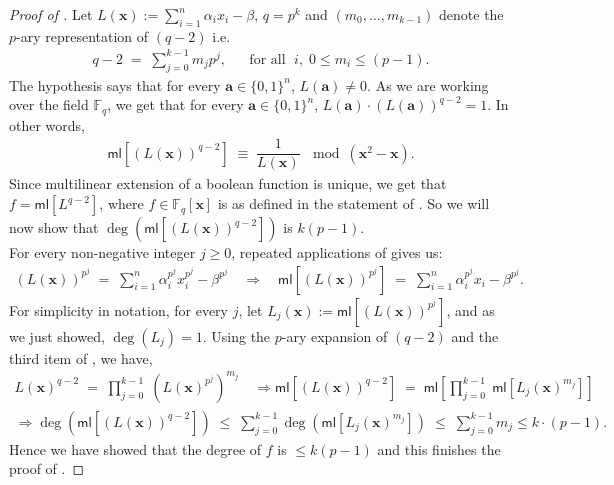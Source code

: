 \documentclass[11pt]{article}
\newcommand{\Boo}{\{0,1 \}}
\newcommand{\brac}[1]{\left[ #1 \right]}
\newcommand{\F}{\mathbb{F}}
\newcommand{\ml}{\mathsf{ml}}
\begin{document}
\begin{proof}[Proof of ]
Let $L(\mathbf{x}) := \sum_{i=1}^{n} \alpha_{i} x_{i} - \beta$, $q = p^{k}$ and $(m_{0},\ldots,m_{k-1})$ denote the $p$-ary representation of $(q-2)$ i.e.
\begin{align*}
    q-2 \; = \; \sum_{j=0}^{k-1} m_{j} p^{j}, && \text{for all } \; i, \; 0\leq m_{i} \leq (p-1).
\end{align*}
The hypothesis says that for every $\mathbf{a} \in \Boo^{n}$, $L(\mathbf{a}) \neq 0$. As we are working over the field $\F_{q}$, we get that for every $\mathbf{a} \in \Boo^{n}$, $L(\mathbf{a}) \cdot (L(\mathbf{a}))^{q-2} = 1$. In other words,
\begin{align*}
 \ml[(L(\mathbf{x}))^{q-2}] \; \equiv \; \dfrac{1}{L(\mathbf{x})} \, \mod{(\mathbf{x}^{2} - \mathbf{x})}.
\end{align*}
Since multilinear extension of a boolean function is unique, we get that $f = \ml[L^{q-2}]$, where $f \in \F_{q}[\mathbf{x}]$ is as defined in the statement of . So we will now show that $\deg(\ml[(L(\mathbf{x}))^{q-2}])$ is $k (p-1)$.\\

\noindent
For every non-negative integer $j \geq 0$, repeated applications of  gives us:
\begin{align*}
    (L(\mathbf{x}))^{p^{j}} \; = \; \sum_{i=1}^{n} \alpha_{i}^{p^{j}} x_{i}^{p^{j}} - \beta^{p^{j}} \quad
    \Rightarrow \quad \ml[(L(\mathbf{x}))^{p^{j}}] \; = \; \sum_{i=1}^{n} \alpha_{i}^{p^{j}} x_{i} - \beta^{p^{j}}.
\end{align*}
For simplicity in notation, for every $j$, let $L_{j}(\mathbf{x}) := \ml[(L(\mathbf{x}))^{p^{j}}]$, and as we just showed, $\deg(L_{j}) = 1$. Using the $p$-ary expansion of $(q-2)$ and the third item of , we have,
\begin{align*}
    L(\mathbf{x})^{q-2} \; = \; \prod_{j=0}^{k-1} \; (L(\mathbf{x})^{p^{j}})^{m_{j}} \quad \Rightarrow \ml[(L(\mathbf{x}))^{q-2}] \; = \; \ml\brac{  \prod_{j=0}^{k-1} \; \ml[L_{j}(\mathbf{x})  ^{m_{j}}] } \\
    \Rightarrow \deg(\ml[(L(\mathbf{x}))^{q-2}]) \; \leq \; \sum_{j=0}^{k-1} \deg(\ml[L_{j}(\mathbf{x})  ^{m_{j}}]) \; \leq \; \sum_{j=0}^{k-1} m_{j} \leq k \cdot (p-1).
\end{align*}
Hence we have showed that the degree of $f$ is $\leq k(p-1)$ and this finishes the proof of .
\end{proof}
\end{document}
